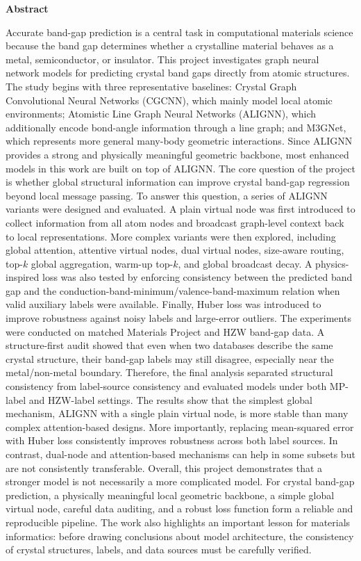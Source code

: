\documentclass[11pt,a4paper]{article}
\begin{document}
\begin{center}
{\Large\bfseries Abstract}
\end{center}

\vspace{0.4em}

Accurate band-gap prediction is a central task in computational materials science because the band gap determines whether a crystalline material behaves as a metal, semiconductor, or insulator. This project investigates graph neural network models for predicting crystal band gaps directly from atomic structures. The study begins with three representative baselines: Crystal Graph Convolutional Neural Networks (CGCNN), which mainly model local atomic environments; Atomistic Line Graph Neural Networks (ALIGNN), which additionally encode bond-angle information through a line graph; and M3GNet, which represents more general many-body geometric interactions. Since ALIGNN provides a strong and physically meaningful geometric backbone, most enhanced models in this work are built on top of ALIGNN. The core question of the project is whether global structural information can improve crystal band-gap regression beyond local message passing. To answer this question, a series of ALIGNN variants were designed and evaluated. A plain virtual node was first introduced to collect information from all atom nodes and broadcast graph-level context back to local representations. More complex variants were then explored, including global attention, attentive virtual nodes, dual virtual nodes, size-aware routing, top-\(k\) global aggregation, warm-up top-\(k\), and global broadcast decay. A physics-inspired loss was also tested by enforcing consistency between the predicted band gap and the conduction-band-minimum/valence-band-maximum relation when valid auxiliary labels were available. Finally, Huber loss was introduced to improve robustness against noisy labels and large-error outliers. The experiments were conducted on matched Materials Project and HZW band-gap data. A structure-first audit showed that even when two databases describe the same crystal structure, their band-gap labels may still disagree, especially near the metal/non-metal boundary. Therefore, the final analysis separated structural consistency from label-source consistency and evaluated models under both MP-label and HZW-label settings. The results show that the simplest global mechanism, ALIGNN with a single plain virtual node, is more stable than many complex attention-based designs. More importantly, replacing mean-squared error with Huber loss consistently improves robustness across both label sources. In contrast, dual-node and attention-based mechanisms can help in some subsets but are not consistently transferable. Overall, this project demonstrates that a stronger model is not necessarily a more complicated model. For crystal band-gap prediction, a physically meaningful local geometric backbone, a simple global virtual node, careful data auditing, and a robust loss function form a reliable and reproducible pipeline. The work also highlights an important lesson for materials informatics: before drawing conclusions about model architecture, the consistency of crystal structures, labels, and data sources must be carefully verified.
\end{document}
